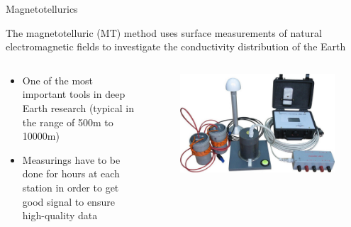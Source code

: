 \documentclass[mathserif,12pt,handout,notes=show]{beamer}
\begin{document}
\begin{frame}{Magnetotellurics}

    \begin{block}{}
        The magnetotelluric (MT) method uses surface measurements
        of natural electromagnetic fields to investigate the
        conductivity distribution of the Earth
    \end{block}
    \begin{block}{}
    \begin{columns}
        \begin{column}{0.6\textwidth}
            \begin{itemize}
                \item One of the most important tools in deep Earth research
                      (typical in the range of 500m to 10000m)
                \item Measurings have to be done for hours at each station
                      in order to get good signal to ensure high-quality data
            \end{itemize}            
        \end{column}
        \begin{column}{0.4\textwidth}
            \begin{figure}
                \centering
                \includegraphics[width=\textwidth]{magnetotelluric-station}    
            \end{figure}
        \end{column}
    \end{columns}
    \end{block}

\end{frame}
\note{
    \lipsum[1]
}
\end{document}

